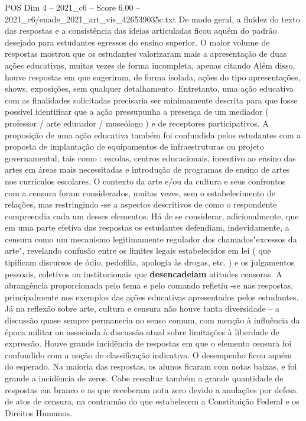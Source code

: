 \begin{textsample}{POS Dim 4 – 2021\_c6 – Score 6.00 – 2021\_c6/enade\_2021\_art\_vis\_426539035c.txt}
De modo geral, a fluidez do texto das respostas e a consistência das ideias articuladas ficou aquém do padrão desejado para estudantes egressos do ensino superior.
O maior volume de respostas mostrou que os estudantes valorizaram mais a apresentação de duas ações educativas, muitas vezes de forma incompleta, apenas citando Além disso, houve respostas em que sugeriram, de forma isolada, ações do tipo apresentações, shows, exposições, sem qualquer detalhamento.
Entretanto, uma ação educativa com as finalidades solicitadas precisaria ser minimamente descrita para que fosse possível identificar que a ação pressupunha a presença de um mediador ( professor / arte educador / museólogo ) e de receptores participativos.
A proposição de uma ação educativa também foi confundida pelos estudantes com a proposta de implantação de equipamentos de infraestruturas ou projeto governamental, tais como : escolas, centros educacionais, incentivo ao ensino das artes em áreas mais necessitadas e introdução de programas de ensino de artes nos currículos escolares.
O contexto da arte e/ou da cultura e seus confrontos com a censura foram considerados, muitas vezes, sem o estabelecimento de relações, mas restringindo -se a aspectos descritivos de como o respondente compreendia cada um desses elementos.
Há de se considerar, adicionalmente, que em uma parte efetiva das respostas os estudantes defendiam, indevidamente, a censura como um mecanismo legitimamente regulador dos chamados"excessos da arte", revelando confusão entre os limites legais estabelecidos em lei ( que tipificam discursos de ódio, pedofilia, apologia às drogas, etc. ) e os julgamentos pessoais, coletivos ou institucionais que \textbf{desencadeiam} atitudes censoras.
A abrangência proporcionada pelo tema e pelo comando refletiu -se nas respostas, principalmente nos exemplos das ações educativas apresentados pelos estudantes.
Já na reflexão sobre arte, cultura e censura não houve tanta diversidade – a discussão quase sempre permanecia no senso comum, com menção à influência da época militar ou associada à discussão atual sobre limitações à liberdade de expressão.
Houve grande incidência de respostas em que o elemento censura foi confundido com a noção de classificação indicativa.
O desempenho ficou aquém do esperado.
Na maioria das respostas, os alunos ficaram com notas baixas, e foi grande a incidência de zeros.
Cabe ressaltar também a grande quantidade de respostas em branco e as que receberam nota zero devido a anulações por defesa de atos de censura, na contramão do que estabelecem a Constituição Federal e os Direitos Humanos.

\end{textsample}
